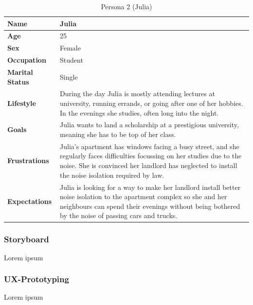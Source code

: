 \begin{table}[H]
    \centering
    \begin{tabularx}{\textwidth}{|l|X|}
        \hline
        \textbf{Name} & Julia \\
        \hline
        \textbf{Age} & 25 \\
        \hline
        \textbf{Sex} & Female \\
        \hline
        \textbf{Occupation} & Student \\
        \hline
        \textbf{Marital Status} & Single \\
        \hline
        \textbf{Lifestyle} & During the day Julia is mostly attending lectures at university, running errands, or going after one of her hobbies.
        In the evenings she studies, often long into the night. \\
        \hline
        \textbf{Goals} & Julia wants to land a scholarship at a prestigious university, meaning she has to be top of her class. \\
        \hline
        \textbf{Frustrations} & Julia's apartment has windows facing a busy street, and she regularly faces difficulties focussing on her studies
        due to the noise. She is convinced her landlord has neglected to install the noise isolation required by law. \\
        \hline
        \textbf{Expectations} & Julia is looking for a way to make her landlord install better noise isolation to the apartment complex so she and
        her neighbours can spend their evenings without being bothered by the noise of passing cars and trucks. \\
        \hline
    \end{tabularx}
    \caption{Persona 2 (Julia)}
    \label{table:persona2}
\end{table}

\subsubsection{Storyboard}
\label{subsubsec:storyboard}
Lorem ipsum

\subsubsection{UX-Prototyping}
\label{subsubsec:ux_prototyping}
Lorem ipsum